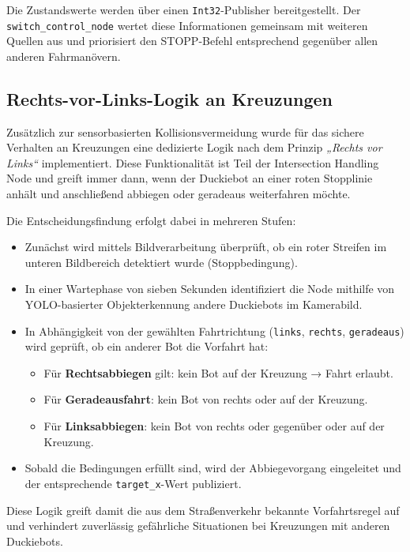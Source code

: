 Die Zustandswerte werden über einen \texttt{Int32}-Publisher bereitgestellt. Der \texttt{switch\_control\_node} wertet diese Informationen gemeinsam mit weiteren Quellen aus und priorisiert den STOPP-Befehl entsprechend gegenüber allen anderen Fahrmanövern.

\subsection{Rechts-vor-Links-Logik an Kreuzungen}

Zusätzlich zur sensorbasierten Kollisionsvermeidung wurde für das sichere Verhalten an Kreuzungen eine dedizierte Logik nach dem Prinzip \textit{„Rechts vor Links“} implementiert. Diese Funktionalität ist Teil der Intersection Handling Node und greift immer dann, wenn der Duckiebot an einer roten Stopplinie anhält und anschließend abbiegen oder geradeaus weiterfahren möchte. 

Die Entscheidungsfindung erfolgt dabei in mehreren Stufen:
\begin{itemize}
    \item Zunächst wird mittels Bildverarbeitung überprüft, ob ein roter Streifen im unteren Bildbereich detektiert wurde (Stoppbedingung).
    \item In einer Wartephase von sieben Sekunden identifiziert die Node mithilfe von YOLO-basierter Objekterkennung andere Duckiebots im Kamerabild.
    \item In Abhängigkeit von der gewählten Fahrtrichtung (\texttt{links}, \texttt{rechts}, \texttt{geradeaus}) wird geprüft, ob ein anderer Bot die Vorfahrt hat:
    \begin{itemize}
        \item Für \textbf{Rechtsabbiegen} gilt: kein Bot auf der Kreuzung → Fahrt erlaubt.
        \item Für \textbf{Geradeausfahrt}: kein Bot von rechts oder auf der Kreuzung.
        \item Für \textbf{Linksabbiegen}: kein Bot von rechts oder gegenüber oder auf der Kreuzung.
    \end{itemize}
    \item Sobald die Bedingungen erfüllt sind, wird der Abbiegevorgang eingeleitet und der entsprechende \texttt{target\_x}-Wert publiziert.
\end{itemize}

Diese Logik greift damit die aus dem Straßenverkehr bekannte Vorfahrtsregel auf und verhindert zuverlässig gefährliche Situationen bei Kreuzungen mit anderen Duckiebots. 

